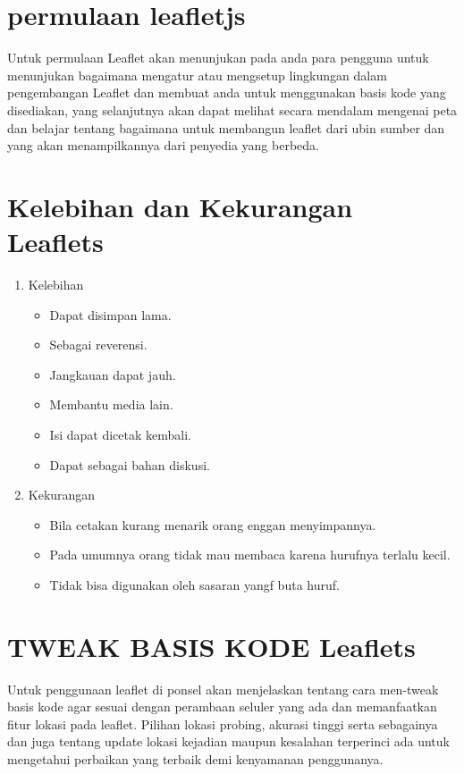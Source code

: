 \section{permulaan leafletjs}
Untuk permulaan Leaflet akan menunjukan pada anda para pengguna untuk menunjukan bagaimana mengatur atau mengsetup lingkungan dalam pengembangan Leaflet dan membuat anda untuk menggunakan basis kode yang disediakan, yang selanjutnya akan dapat melihat secara mendalam mengenai peta dan belajar tentang bagaimana untuk membangun leaflet dari ubin sumber dan yang akan menampilkannya dari penyedia yang berbeda.


\section{Kelebihan dan Kekurangan Leaflets}
\begin{enumerate}
	\item Kelebihan
		\begin{itemize}
			\item Dapat disimpan lama.
			\item Sebagai reverensi.
			\item Jangkauan dapat jauh.
			\item Membantu media lain.
			\item Isi dapat dicetak kembali.
			\item Dapat sebagai bahan diskusi.
		\end{itemize}
	\item Kekurangan
	\begin{itemize}
			\item Bila cetakan kurang menarik orang enggan menyimpannya.
			\item Pada umumnya orang tidak mau membaca karena hurufnya terlalu kecil.
			\item Tidak bisa digunakan oleh sasaran yangf buta huruf.
		\end{itemize}
\end{enumerate}

\section{TWEAK BASIS KODE Leaflets}
Untuk penggunaan leaflet di ponsel akan menjelaskan tentang cara men-tweak basis kode agar sesuai dengan perambaan seluler yang ada  dan memanfaatkan fitur lokasi pada leaflet. Pilihan lokasi probing, akurasi tinggi serta sebagainya dan juga tentang update lokasi kejadian maupun kesalahan terperinci ada untuk mengetahui perbaikan yang terbaik demi kenyamanan penggunanya.
